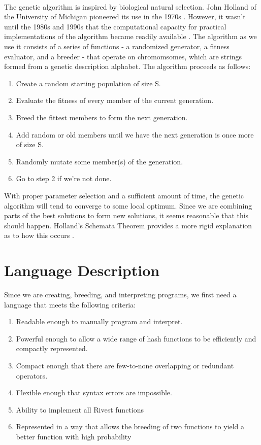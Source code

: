 \documentclass{article}
\begin{document}
\paragraph{}
The genetic algorithm is inspired by biological natural selection. John Holland of the University of Michigan pioneered its use in the 1970s \cite{Holland1973}.
However, it wasn't until the 1980s and 1990s that the computational capacity for practical implementations of the algorithm became readily available \cite{Goldberg}. The algorithm as we use it consists of a series of functions - a randomized generator, a fitness evaluator, and a breeder - that operate on chromomsomes, which are strings formed from a genetic description alphabet. The algorithm proceeds as follows:
\begin{enumerate}
	\item Create a random starting population of size S.
	\item Evaluate the fitness of every member of the current generation.
	\item Breed the fittest members to form the next generation.
	\item Add random or old members until we have the next generation is once more of size S.
	\item Randomly mutate some member(s) of the generation.
	\item Go to step 2 if we're not done.
\end{enumerate}

With proper parameter selection and a sufficient amount of time, the genetic algorithm will tend to converge to some local optimum. Since we are combining parts of the best solutions to form new solutions, it seems reasonable that this should happen. Holland's Schemata Theorem provides a more rigid explanation as to how this occurs \cite{citeulike:1281572}.

\section{Language Description}
Since we are creating, breeding, and interpreting programs, we first need a language that meets the following criteria:

\begin{enumerate}
\item Readable enough to manually program and interpret.
\item Powerful enough to allow a wide range of hash functions to be efficiently and compactly represented.
\item Compact enough that there are few-to-none overlapping or redundant operators.
\item Flexible enough that syntax errors are impossible.
\item Ability to implement all Rivest functions
\item Represented in a way that allows the breeding of two functions to yield a better function with high probability
\end{enumerate}
\end{document}
